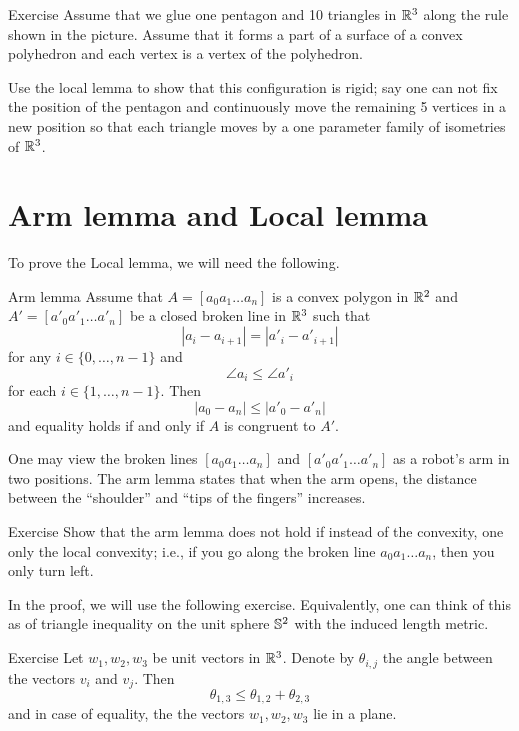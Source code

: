 \begin{thm}{Exercise}
Assume that we glue one pentagon and 10 triangles in $\mathbb{R}^3$ along the rule shown in the picture.
Assume that it forms a part of a surface of a convex polyhedron and each vertex is a vertex of the polyhedron.

Use the local lemma to show that this configuration is rigid;  say one can not fix the position of the pentagon and continuously move the remaining 5 vertices in a new position so that each triangle moves by a one parameter family of isometries of $\mathbb{R}^3$.
\end{thm}

\section{Arm lemma and Local lemma}

To prove the Local lemma, we will need the following.

\begin{thm}{Arm lemma}\label{lem:arm}
Assume that $A=[a_0 a_1\dots a_n]$ is a convex polygon in $\mathbb{R}^2$
and $A'=[a'_0 a'_1\dots a'_n]$ be a closed broken line in $\mathbb{R}^3$
such that 
$$|a_i-a_{i+1}|=|a'_i-a'_{i+1}|$$ for any $i\in\{0,\dots,n-1\}$
and 
$$\angle a_i\le \angle a'_i$$ 
for each $i\in\{1,\dots,n-1\}$.
Then 
$$|a_0-a_n|\le |a'_0-a'_n|$$
and equality holds if and only if $A$ is congruent to $A'$.
\end{thm}

One may view the broken lines $[a_0a_1\dots a_n]$ and $[a'_0a'_1\dots a'_n]$ as a robot's arm in two positions.
The arm lemma states that when the arm opens, 
the distance between the ``shoulder'' and ``tips of the fingers'' increases. 

\begin{thm}{Exercise}
Show that the arm lemma does not hold if 
instead of the convexity,
one only the local convexity;
i.e.,  if you go along the broken line $a_0 a_1\dots a_n$, then you only turn left.
\end{thm}

In the proof, we will use the following exercise. Equivalently, one can think of this as of triangle inequality on the unit sphere $\mathbb{S}^2$ with the induced length metric.  

\begin{thm}{Exercise}\label{ex:angle-triangle}
Let $w_1,w_2,w_3$ be unit vectors in $\mathbb{R}^3$.
Denote by $\theta_{i,j}$ the angle between the vectors $v_i$ and $v_j$.
Then 
$$\theta_{1,3}\le \theta_{1,2}+\theta_{2,3}$$
and in case of equality, the the vectors $w_1,w_2,w_3$ lie in a plane.
\end{thm}




